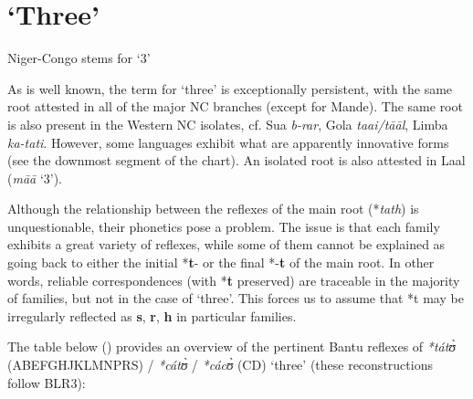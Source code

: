 \clearpage
\section{‘Three’} 
\begin{table}
\caption{\label{tab:4:5}Niger-Congo stems for `3'}
\kppyramid
{}


 
\end{table}

As is well known, the term for ‘three’ is exceptionally persistent, with the same root attested in all of the major NC branches (except for Mande). The same root is also present in the Western NC isolates, cf. Sua \textit{b-rar}, Gola \textit{taai/t{\={a}}{\={a}}l}, Limba \textit{ka-tati}. However, some languages exhibit what are apparently innovative forms (see the downmost segment of the chart). An isolated root is also attested in Laal (\textit{m{\={a}}{\={a}}} ‘3’).

Although the relationship between the reflexes of the main root (*\textit{tath}) is unquestionable, their phonetics pose a problem. The issue is that each family exhibits a great variety of reflexes, while some of them cannot be explained as going back to either the initial *\textbf{t}- or the final *-\textbf{t} of the main root. In other words, reliable correspondences (with *\textbf{t} preserved) are traceable in the majority of families, but not in the case of ‘three’. This forces us to assume that *t may be irregularly reflected as \textbf{s}, \textbf{r}, \textbf{h} in particular families.

The table below () provides an overview of the pertinent Bantu reflexes of \textit{*tát{\`{ʊ}}} (ABEFGHJKLMNPRS) / \textit{*cát{\`{ʊ}}} / \textit{*các{\`{ʊ}}}   (CD) ‘three’ (these reconstructions follow BLR3):

